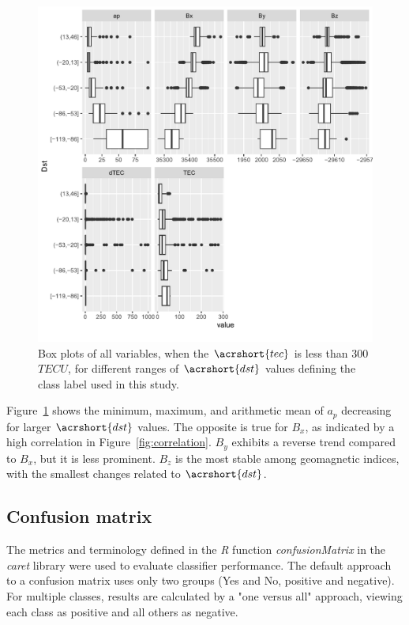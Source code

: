 \let\LaTeXcline\cline\documentclass[sn-mathphys-num]{sn-jnl}\let\cline\LaTeXcline
\begin{document}
\begin{figure}[!ht]
    \centering
    \includegraphics[width=\linewidth]{iono3boxplot_fix.pdf}
    \caption{Box plots of all variables, when the $\acrshort{tec}$ is less than $300$ $TECU$, for different ranges of $\acrshort{dst}$ values defining the class label used in this study.}
    \label{fig:iono3boxplot}
\end{figure}

Figure~\ref{fig:iono3boxplot} shows the minimum, maximum, and arithmetic mean of $a_{p}$ decreasing for larger $\acrshort{dst}$ values. The opposite is true for $B_{x}$, as indicated by a high correlation in Figure~\ref{fig:correlation}. $B_{y}$ exhibits a reverse trend compared to $B_{x}$, but it is less prominent. $B_{z}$ is the most stable among geomagnetic indices, with the smallest changes related to $\acrshort{dst}$.

\subsection{Confusion matrix}

The metrics and terminology defined in the \textit{R} function \textit{confusionMatrix} in the \textit{caret} library \cite{Kuhn2007, kuhn2008building} were used to evaluate classifier performance. The default approach to a confusion matrix uses only two groups (Yes and No, positive and negative). For multiple classes, results are calculated by a "one versus all" approach, viewing each class as positive and all others as negative.
\end{document}
